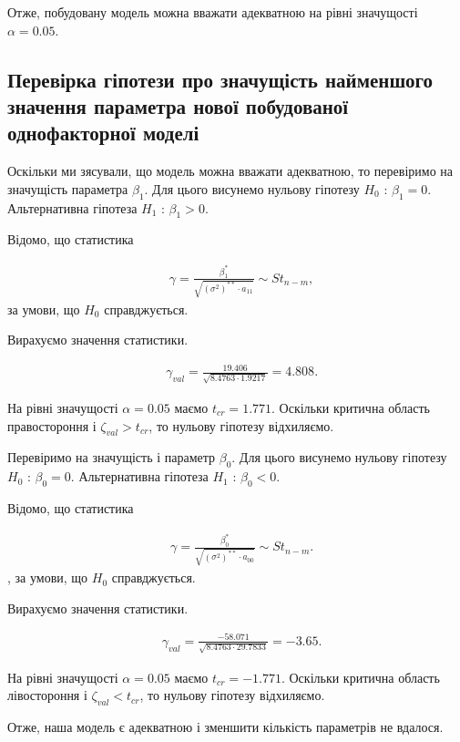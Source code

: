 \documentclass[14pt,a4paper]{scrartcl}
\theoremstyle{definition}
\theoremstyle{remark}
\theoremstyle{definition}
\theoremstyle{definition}
\begin{document}
Отже, побудовану модель можна вважати адекватною на рівні значущості $\alpha = 0.05$.

\subsection{Перевірка гіпотези про значущість найменшого значення параметра нової побудованої однофакторної моделі}

Оскільки ми з\textquotesingle ясували, що модель можна вважати адекватною, то перевіримо на значущість параметра $\beta_{1}$. Для цього висунемо нульову гіпотезу $H_{0}$ : $\beta_{1} = 0$. Альтернативна гіпотеза $H_{1}$ : $\beta_{1} > 0$.

Відомо, що статистика

\begin{align*}
  & \gamma = \frac{\beta_{1}^{*}}{\sqrt{(\sigma^2)^{**}\cdot a_{11}}} \sim St_{n - m},
\end{align*} за умови, що $H_{0}$ справджується.

Вирахуємо значення статистики.

\begin{align*}
  & \gamma_{val} = \frac{19.406}{\sqrt{8.4763 \cdot 1.9217}} = 4.808.
\end{align*}

На рівні значущості $\alpha = 0.05$ маємо $t_{cr} = 1.771$. Оскільки критична область правостороння і $\zeta_{val} > t_{cr}$, то нульову гіпотезу відхиляємо.

Перевіримо на значущість і параметр $\beta_{0}$. Для цього висунемо нульову гіпотезу $H_{0}$ : $\beta_{0} = 0$. Альтернативна гіпотеза $H_{1}$ : $\beta_{0} < 0$.

Відомо, що статистика

\begin{align*}
  & \gamma = \frac{\beta_{0}^{*}}{\sqrt{(\sigma^2)^{**}\cdot a_{00}}} \sim St_{n - m}.
\end{align*}, за умови, що $H_{0}$ справджується.

Вирахуємо значення статистики.

\begin{align*}
  & \gamma_{val} = \frac{-58.071}{\sqrt{8.4763 \cdot 29.7833}} = -3.65.
\end{align*}

На рівні значущості $\alpha = 0.05$ маємо $t_{cr} = -1.771$. Оскільки критична область лівостороння і $\zeta_{val} < t_{cr}$, то нульову гіпотезу відхиляємо.

Отже, наша модель є адекватною і зменшити кількість параметрів не вдалося.
\end{document}
